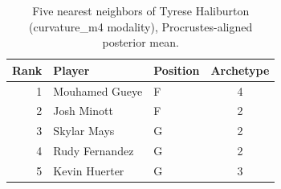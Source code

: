 \begin{table}[htbp]
  \centering\small
  \begin{tabular}{rllc}
    \toprule
    Rank & Player & Position & Archetype \\
    \midrule
    1 & Mouhamed Gueye & F & 4 \\
    2 & Josh Minott & F & 2 \\
    3 & Skylar Mays & G & 2 \\
    4 & Rudy Fernandez & G & 2 \\
    5 & Kevin Huerter & G & 3 \\
    \bottomrule
  \end{tabular}
  \caption{Five nearest neighbors of Tyrese Haliburton (curvature_m4 modality), Procrustes-aligned posterior mean.}
  \label{tab:Tyrese_Haliburton_neighbors_curvature_m4}
\end{table}

